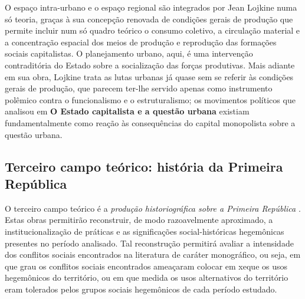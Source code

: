 O espaço intra-urbano e o espaço regional são integrados por Jean Lojkine numa só teoria, graças à sua concepção renovada de condições gerais de produção que permite incluir num só quadro teórico o consumo coletivo, a circulação material e a concentração espacial dos meios de produção e reprodução das formações sociais capitalistas. O planejamento urbano, aqui, é uma intervenção contraditória do Estado sobre a socialização das forças produtivas. Mais adiante em sua obra, Lojkine trata as lutas urbanas já quase sem se referir às condições gerais de produção, que parecem ter-lhe servido apenas como instrumento polêmico contra o funcionalismo e o estruturalismo; os movimentos políticos que analisou em \textbf{O Estado capitalista e a questão urbana} existiam fundamentalmente como reação às consequências do capital monopolista sobre a questão urbana.

\subsection{Terceiro campo teórico: história da Primeira República}
\label{subsec:histprirep}

O terceiro campo teórico é a \textit{produção historiográfica sobre a Primeira República} \cite{BRUNO1967, carone_evolucao_1977, CARONE1970inst, faoro_donos_2001, freyre_ordem_2004, janotti_subversivos_1986, leal_coronelismo_2012, LINS1988coro, PEDROSA1966a, PEDROSA1966b, pires_eleicoes_1995, saes_classemedia_1975, silva_historiaeconomica_2002}. Estas obras permitirão reconstruir, de modo razoavelmente aproximado, a institucionalização de práticas \cite{BERNARDO1991} e as significações social-históricas \cite{CASTORIADIS1982} hegemônicas presentes no período analisado. Tal reconstrução permitirá avaliar a intensidade dos conflitos sociais encontrados na literatura de caráter monográfico, ou seja, em que grau os conflitos sociais encontrados ameaçaram colocar em xeque os usos hegemônicos do território, ou em que medida os usos alternativos do território eram tolerados pelos grupos sociais hegemônicos de cada período estudado.

